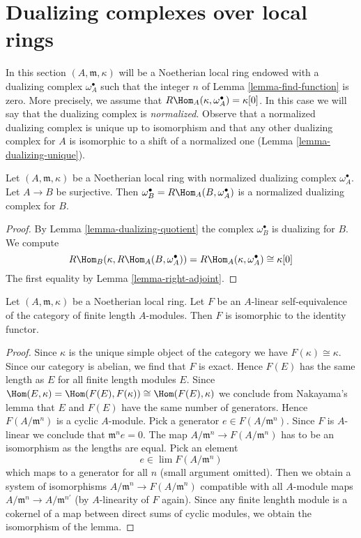 \section{Dualizing complexes over local rings}
\label{section-dualizing-local}

\noindent
In this section $(A, \mathfrak m, \kappa)$ will be a Noetherian local
ring endowed with a dualizing complex $\omega_A^\bullet$ such that
the integer $n$ of Lemma \ref{lemma-find-function} is zero.
More precisely, we assume that $R\Hom_A(\kappa, \omega_A^\bullet) = \kappa[0]$.
In this case we will say that the dualizing complex is {\it normalized}.
Observe that a normalized dualizing complex is unique up to
isomorphism and that any other dualizing complex for $A$ is isomorphic
to a shift of a normalized one (Lemma \ref{lemma-dualizing-unique}).

\begin{lemma}
\label{lemma-normalized-quotient}
Let $(A, \mathfrak m, \kappa)$ be a Noetherian local
ring with normalized dualizing complex $\omega_A^\bullet$.
Let $A \to B$ be surjective. Then
$\omega_B^\bullet = R\Hom_A(B, \omega_A^\bullet)$ is a
normalized dualizing complex for $B$.
\end{lemma}

\begin{proof}
By Lemma \ref{lemma-dualizing-quotient} the complex
$\omega_B^\bullet$ is dualizing for $B$. We compute
$$
R\Hom_B(\kappa, R\Hom_A(B, \omega_A^\bullet)) =
R\Hom_A(\kappa, \omega_A^\bullet) \cong \kappa[0]
$$
The first equality by Lemma \ref{lemma-right-adjoint}.
\end{proof}

\begin{lemma}
\label{lemma-equivalence-finite-length}
Let $(A, \mathfrak m, \kappa)$ be a Noetherian local
ring. Let $F$ be an $A$-linear self-equivalence of the category of
finite length $A$-modules. Then $F$ is isomorphic to the identity functor.
\end{lemma}

\begin{proof}
Since $\kappa$ is the unique simple object of the category we have
$F(\kappa) \cong \kappa$. Since our category is abelian, we find that
$F$ is exact. Hence $F(E)$ has the same length as $E$ for all finite
length modules $E$.
Since $\Hom(E, \kappa) = \Hom(F(E), F(\kappa)) \cong \Hom(F(E), \kappa)$
we conclude from Nakayama's lemma that $E$ and $F(E)$ have the same
number of generators. Hence $F(A/\mathfrak m^n)$ is a cyclic $A$-module.
Pick a generator $e \in F(A/\mathfrak m^n)$.
Since $F$ is $A$-linear we conclude that $\mathfrak m^n e = 0$.
The map $A/\mathfrak m^n \to F(A/\mathfrak m^n)$ has to be
an isomorphism as the lengths are equal. Pick an element
$$
e \in \lim F(A/\mathfrak m^n)
$$
which maps to a generator for all $n$ (small argument omitted).
Then we obtain a system of isomorphisms
$A/\mathfrak m^n \to F(A/\mathfrak m^n)$ compatible with all
$A$-module maps $A/\mathfrak m^n \to A/\mathfrak m^{n'}$ (by $A$-linearity
of $F$ again). Since any finite lenghth module is a cokernel
of a map between direct sums of cyclic modules, we obtain the isomorphism
of the lemma.
\end{proof}

